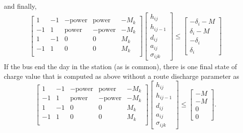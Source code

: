and finally,
\begin{equation} \begin{aligned}
	\begin{bmatrix}1  & -1 & -\text{power} & \text{power}   & -M_k \\
		       -1 & 1  & \text{power}  & -\text{power}  & -M_k \\
		       1  & -1 & 0             & 0              & M_k  \\
		       -1 & 1  & 0             & 0              & M_k  \\
	\end{bmatrix}
	\begin{bmatrix}h_{ij} \\ h_{ij-1} \\ d_{ij} \\ a_{ij} \\ \sigma_{ijk} \end{bmatrix} \le 
		\begin{bmatrix}-\delta_i - M \\ \delta_i - M \\ -\delta_i \\ \delta_i \end{bmatrix}
\end{aligned} \end{equation}
If the bus end the day in the station (as is common), there is one final state of charge value that is computed as above without a route discharge parameter as
\begin{equation}
\begin{bmatrix}1  & -1 & -\text{power} & \text{power}   & -M_k \\
		       -1 & 1  & \text{power}  & -\text{power}  & -M_k \\
		       1  & -1 & 0             & 0              & M_k  \\
		       -1 & 1  & 0             & 0              & M_k  \\
	\end{bmatrix}
	\begin{bmatrix}h_{ij} \\ h_{ij-1} \\ d_{ij} \\ a_{ij} \\ \sigma_{ijk} \end{bmatrix} \le 
		\begin{bmatrix}- M \\ - M \\ 0 \\ 0 \end{bmatrix}.
\end{equation}
